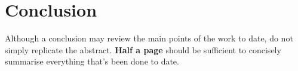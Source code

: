 \section{Conclusion}

Although a conclusion may review the main points of the work to date, do not simply replicate the abstract. \textbf{Half a page} should be sufficient to concisely summarise everything that’s been done to date.